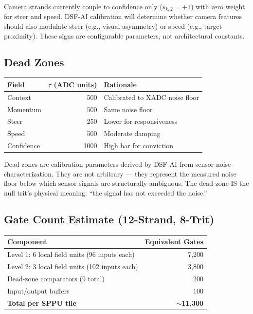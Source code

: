 \documentclass[11pt, a4paper]{article}
\begin{document}
Camera strands currently couple to confidence only ($s_{k,2} = +1$)
with zero weight for steer and speed. DSF-AI calibration will
determine whether camera features should also modulate steer
(e.g., visual asymmetry) or speed (e.g., target proximity).
These signs are configurable parameters, not architectural
constants.

\subsection{Dead Zones}

\begin{center}
\begin{tabular}{@{}lrl@{}}
\toprule
\textbf{Field} & \textbf{$\tau$ (ADC units)} & \textbf{Rationale} \\
\midrule
Context    & 500  & Calibrated to XADC noise floor \\
Momentum   & 500  & Same noise floor \\
Steer      & 250  & Lower for responsiveness \\
Speed      & 500  & Moderate damping \\
Confidence & 1000 & High bar for conviction \\
\bottomrule
\end{tabular}
\end{center}

Dead zones are calibration parameters derived by DSF-AI from
sensor noise characterization. They are not arbitrary --- they
represent the measured noise floor below which sensor signals
are structurally ambiguous. The dead zone IS the null trit's
physical meaning: ``the signal has not exceeded the noise.''

\subsection{Gate Count Estimate (12-Strand, 8-Trit)}

\begin{center}
\begin{tabular}{@{}lr@{}}
\toprule
\textbf{Component} & \textbf{Equivalent Gates} \\
\midrule
Level 1: 6 local field units (96 inputs each) & 7,200 \\
Level 2: 3 local field units (102 inputs each) & 3,800 \\
Dead-zone comparators (9 total) & 200 \\
Input/output buffers & 100 \\
\midrule
\textbf{Total per SPPU tile} & \textbf{$\sim$11,300} \\
\bottomrule
\end{tabular}
\end{center}
\end{document}
